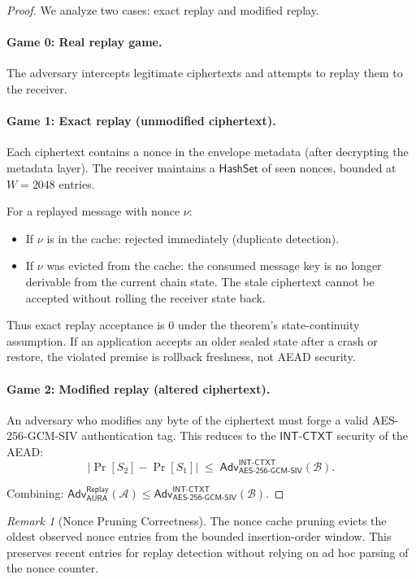 \documentclass[11pt,a4paper]{article}
\theoremstyle{definition}
\theoremstyle{remark}
\newtheorem{remark}[theorem]{Remark}
\newcommand{\adv}{\mathsf{Adv}}
\newcommand{\advA}{\mathcal{A}}
\newcommand{\advB}{\mathcal{B}}
\newcommand{\AEAD}{\mathsf{AES\text{-}256\text{-}GCM\text{-}SIV}}
\newcommand{\INTCTXT}{\mathsf{INT\text{-}CTXT}}
\begin{document}
\begin{proof}
We analyze two cases: exact replay and modified replay.

\paragraph{Game 0: Real replay game.}
The adversary intercepts legitimate ciphertexts and attempts to replay them
to the receiver.

\paragraph{Game 1: Exact replay (unmodified ciphertext).}
Each ciphertext contains a nonce in the envelope metadata (after decrypting
the metadata layer).  The receiver maintains a $\mathsf{HashSet}$ of seen
nonces, bounded at $W = 2048$ entries.

For a replayed message with nonce $\nu$:
\begin{itemize}[nosep]
  \item If $\nu$ is in the cache: rejected immediately (duplicate detection).
  \item If $\nu$ was evicted from the cache: the consumed message key is no
        longer derivable from the current chain state. The stale ciphertext
        cannot be accepted without rolling the receiver state back.
\end{itemize}

Thus exact replay acceptance is $0$ under the theorem's state-continuity
assumption. If an application accepts an older sealed state after a crash or
restore, the violated premise is rollback freshness, not AEAD security.

\paragraph{Game 2: Modified replay (altered ciphertext).}
An adversary who modifies any byte of the ciphertext must forge a valid
AES-256-GCM-SIV authentication tag.  This reduces to the $\INTCTXT$
security of the AEAD:
\[
  |\Pr[S_2] - \Pr[S_1]| \;\leq\; \adv^{\INTCTXT}_{\AEAD}(\advB).
\]

Combining: $\adv^{\mathsf{Replay}}_{\mathsf{AURA}}(\advA) \leq
\adv^{\INTCTXT}_{\AEAD}(\advB)$. \qedhere
\end{proof}

\begin{remark}[Nonce Pruning Correctness]
The nonce cache pruning evicts the oldest observed nonce entries from the
bounded insertion-order window. This preserves recent entries for replay
detection without relying on ad hoc parsing of the nonce counter.
\end{remark}
\end{document}
